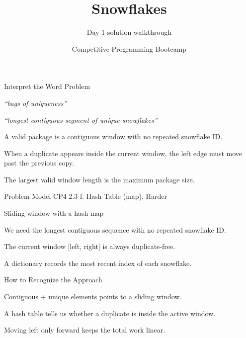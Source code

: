 \documentclass[aspectratio=169,11pt]{beamer}
\title[snowflakes]{Snowflakes}
\subtitle{Day 1 solution walkthrough}
\author[Solution Deck]{Competitive Programming Bootcamp}
\date{}
\begin{document}
\begin{frame}[plain]
  \titlepage
\end{frame}

\begin{frame}{Interpret the Word Problem}
\small
{}
\begin{tightitemize}
  \item \textit{``bags of uniqueness''}
  \item \textit{``longest contiguous segment of unique snowflakes''}
\end{tightitemize}

\vspace{0.18cm}
\begin{tightitemize}
  \item A valid package is a contiguous window with no repeated snowflake ID.
  \item When a duplicate appears inside the current window, the left edge must move past the previous copy.
  \item The largest valid window length is the maximum package size.
\end{tightitemize}
\end{frame}







\begin{frame}{Problem Model}
\small
{} CP4 2.3 f. Hash Table (map), Harder

\vspace{0.25cm}
 Sliding window with a hash map

\vspace{0.25cm}
\begin{tightitemize}
  \item We need the longest contiguous sequence with no repeated snowflake ID.
  \item The current window [left, right] is always duplicate-free.
  \item A dictionary records the most recent index of each snowflake.
\end{tightitemize}
\end{frame}

\begin{frame}{How to Recognize the Approach}
\begin{tightitemize}
  \item Contiguous + unique elements points to a sliding window.
  \item A hash table tells us whether a duplicate is inside the active window.
  \item Moving left only forward keeps the total work linear.
\end{tightitemize}
\end{frame}
\end{document}
